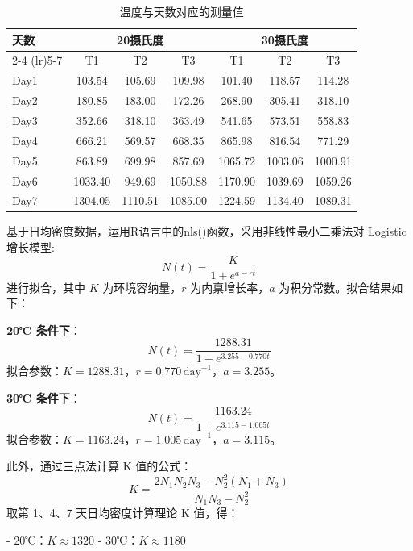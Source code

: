 \documentclass[10.5pt]{config}
\begin{document}
\begin{table}[htbp]
\centering
\caption{温度与天数对应的测量值}
\label{tab:density_data}
\begin{tabular}{l *{6}{c}}
\toprule
\multirow{2}{*}{天数} & \multicolumn{3}{c}{20摄氏度} & \multicolumn{3}{c}{30摄氏度} \\
\cmidrule(lr){2-4} \cmidrule(lr){5-7}
& T1 & T2 & T3 & T1 & T2 & T3 \\
\midrule
        Day1 & 103.54 & 105.69 & 109.98 & 101.40 & 118.57 & 114.28 \\
        Day2 & 180.85 & 183.00 & 172.26 & 268.90 & 305.41 & 318.10 \\
        Day3 & 352.66 & 318.10 & 363.49 & 541.65 & 573.51 & 558.83 \\
        Day4 & 666.21 & 569.57 & 668.35 & 865.98 & 816.54 & 771.29 \\
        Day5 & 863.89 & 699.98 & 857.69 & 1065.72 & 1003.06 & 1000.91 \\
        Day6 & 1033.40 & 949.69 & 1050.88 & 1170.90 & 1039.69 & 1059.26 \\
        Day7 & 1304.05 & 1110.51 & 1085.00 & 1224.59 & 1134.40 & 1089.31 \\
\bottomrule
\end{tabular}
\end{table}

基于日均密度数据，运用R语言中的nls()函数，采用非线性最小二乘法对 Logistic 增长模型:
\begin{equation}
N(t) = \frac{K}{1 + e^{a - rt}}
\end{equation}
进行拟合，其中 $K$ 为环境容纳量，$r$ 为内禀增长率，$a$ 为积分常数。拟合结果如下：

\item \textbf{20℃ 条件下}：
    \begin{equation}
    N(t) = \frac{1288.31}{1 + e^{3.255 - 0.770t}}
    \end{equation}
    拟合参数：$K = 1288.31$，$r = 0.770 \, \text{day}^{-1}$，$a = 3.255$。
    
    \item \textbf{30℃ 条件下}：
    \begin{equation}
    N(t) = \frac{1163.24}{1 + e^{3.115 - 1.005t}}
    \end{equation}
    拟合参数：$K = 1163.24$，$r = 1.005 \, \text{day}^{-1}$，$a = 3.115$。

此外，通过三点法计算 K 值的公式：
\begin{equation}
    K = \frac{2N_1N_2N_3 - N_2^2(N_1 + N_3)}{N_1N_3 - N_2^2}
\end{equation}
取第 1、4、7 天日均密度计算理论 K 值，得：
\begin{center}
- 20℃：$K \approx 1320$ \hspace{2cm} - 30℃：$K \approx 1180$
\end{center}
\end{document}
